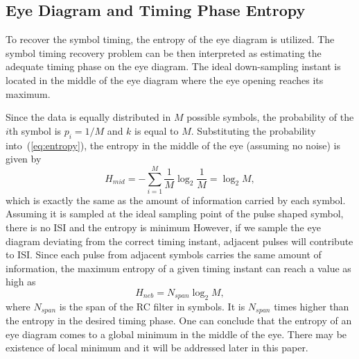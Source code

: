 \documentclass[journal,comsoc]{IEEEtran}
\begin{document}
\subsection{Eye Diagram and Timing Phase Entropy}
\label{sec:eye_entp}
To recover the symbol timing, the entropy of the eye diagram is utilized. 
The symbol timing recovery problem can be then interpreted as estimating the adequate timing phase on the eye diagram.
The ideal down-sampling instant is located in the middle of the eye diagram where the eye opening reaches its maximum.

Since the data is equally distributed in \(M\) possible symbols,
the probability of the $i$th symbol is \(p_i=1/M\) and $k$ is equal to $M$.
Substituting the probability into~(\ref{eq:entropy}), the entropy in the middle of the eye (assuming no noise) is given by
\begin{equation}
H_{mid} =  - \sum\limits_{i = 1}^M {{\frac{1}{M}}\log_2 {\frac{1}{M}}}=\log_2 {M},
\label{eq:entropy_mid}
\end{equation}
which is exactly the same as the amount of information carried by each symbol.
Assuming it is sampled at the ideal sampling point of the pulse shaped symbol, 
there is no ISI and the entropy is minimum
However, if we sample the eye diagram deviating from the correct timing instant, adjacent pulses will contribute to ISI.
Since each pulse from adjacent symbols carries the same amount of information, the maximum entropy of a given timing instant can reach a value as high as
\begin{equation}
H_{neb} =  N_{span}\log_2 {M},
\label{eq:entropy_neb}
\end{equation}
where \(N_{span}\) is the span of the RC filter in symbols.
It is \(N_{span}\) times higher than the entropy in the desired timing phase. 
One can conclude that the entropy of an eye diagram comes to a global minimum in the middle of the eye. 
There may be existence of local minimum and it will be addressed later in this paper.
\end{document}
